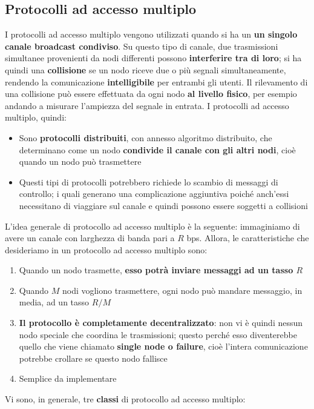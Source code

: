 \documentclass[12pt]{article}
\begin{document}
\subsection{Protocolli ad accesso multiplo}
I protocolli ad accesso multiplo vengono utilizzati quando si ha un \textbf{un singolo canale broadcast condiviso}.
Su questo tipo di canale, due trasmissioni simultanee provenienti da nodi differenti possono \textbf{interferire tra di loro}; si ha quindi una \textbf{collisione} se un nodo riceve due o più segnali simultaneamente, rendendo la comunicazione \textbf{intelligibile} per entrambi gli utenti.
Il rilevamento di una collisione può essere effettuata da ogni nodo \textbf{al livello fisico}, per esempio andando a misurare l'ampiezza del segnale in entrata.
I protocolli ad accesso multiplo, quindi:
\begin{itemize}
    \item Sono \textbf{protocolli distribuiti}, con annesso algoritmo distribuito, che determinano come un nodo \textbf{condivide il canale con gli altri nodi}, cioè quando un nodo può trasmettere
    \item Questi tipi di protocolli potrebbero richiede lo scambio di messaggi di controllo; i quali generano una complicazione aggiuntiva poiché anch'essi necessitano di viaggiare sul canale e quindi possono essere soggetti a collisioni
\end{itemize}
L'idea generale di protocollo ad accesso multiplo è la seguente: immaginiamo di avere un canale con larghezza di banda pari a $R$ bps.
Allora, le caratteristiche che desideriamo in un protocollo ad accesso multiplo sono:
\begin{enumerate}
    \item Quando un nodo trasmette, \textbf{esso potrà inviare messaggi ad un tasso $R$}
    \item Quando $M$ nodi vogliono trasmettere, ogni nodo può mandare messaggio, in media, ad un tasso $R/M$
    \item \textbf{Il protocollo è completamente decentralizzato}: non vi è quindi nessun nodo speciale che coordina le trasmissioni; questo perché esso diventerebbe quello che viene chiamato \textbf{single node o failure}, cioè l'intera comunicazione potrebbe crollare se questo nodo fallisce 
    \item Semplice da implementare
\end{enumerate}
Vi sono, in generale, tre \textbf{classi} di protocollo ad accesso multiplo:
\end{document}
